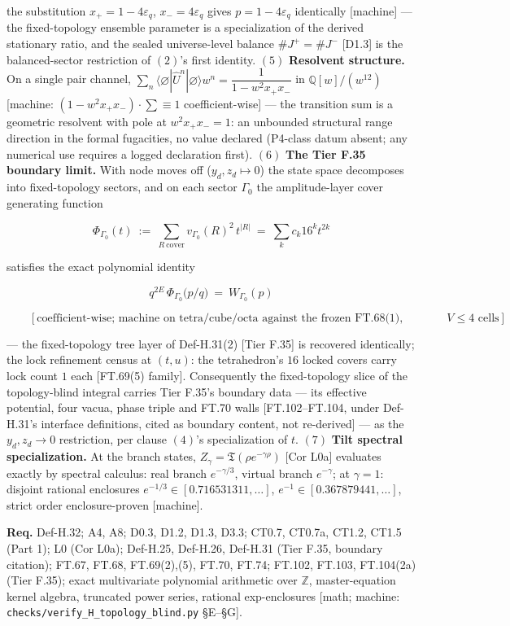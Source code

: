 \begin{theorem}
the substitution $x_+=1-4\varepsilon_q$, $x_-=4\varepsilon_q$ gives $p=1-4\varepsilon_q$ identically [machine] — the fixed-topology ensemble parameter is a specialization of the derived stationary ratio, and the sealed universe-level balance $\#J^+=\#J^-$ [D1.3] is the balanced-sector restriction of $(2)$'s first identity. $(5)$ \textbf{Resolvent structure.} On a single pair channel, $\sum_n\langle\varnothing|\hat U^n|\varnothing\rangle w^n=\dfrac{1}{1-w^2x_+x_-}$ in $\mathbb Q[w]/(w^{12})$ [machine: $(1-w^2x_+x_-)\cdot\sum\equiv1$ coefficient-wise] — the transition sum is a geometric resolvent with pole at $w^2x_+x_-=1$: an unbounded structural range direction in the formal fugacities, no value declared (P4-class datum absent; any numerical use requires a logged declaration first). $(6)$ \textbf{The Tier F.35 boundary limit.} With node moves off ($y_d,z_d\mapsto0$) the state space decomposes into fixed-topology sectors, and on each sector $\Gamma_0$ the amplitude-layer cover generating function

\[
\Phi_{\Gamma_0}(t)\ :=\ \sum_{R\ \mathrm{cover}}v_{\Gamma_0}(R)^2\,t^{|R|}\ =\ \sum_kc_k16^kt^{2k}
\]

satisfies the exact polynomial identity

\[
q^{2E}\,\Phi_{\Gamma_0}\bigl(p/q\bigr)\ =\ W_{\Gamma_0}(p)
\]

\[
\qquad [\text{coefficient-wise; machine on tetra/cube/octa against the frozen FT.68(1),(3)/FT.69(2) rows and on all nine live }V\le4\text{ cells}]
\]

— the fixed-topology tree layer of Def-H.31(2) [Tier F.35] is recovered identically; the lock refinement census at $(t,u)$: the tetrahedron's $16$ locked covers carry lock count $1$ each [FT.69(5) family]. Consequently the fixed-topology slice of the topology-blind integral carries Tier F.35's boundary data — its effective potential, four vacua, phase triple and FT.70 walls [FT.102–FT.104, under Def-H.31's interface definitions, cited as boundary content, not re-derived] — as the $y_d,z_d\to0$ restriction, per clause $(4)$'s specialization of $t$. $(7)$ \textbf{Tilt spectral specialization.} At the branch states, $Z_\gamma=\mathfrak T(\rho e^{-\gamma\rho})$ [Cor L0a] evaluates exactly by spectral calculus: real branch $e^{-\gamma/3}$, virtual branch $e^{-\gamma}$; at $\gamma=1$: disjoint rational enclosures $e^{-1/3}\in[0.716531311,\ldots]$, $e^{-1}\in[0.367879441,\ldots]$, strict order enclosure-proven [machine].

\textbf{Req.} Def-H.32; A4, A8; D0.3, D1.2, D1.3, D3.3; CT0.7, CT0.7a, CT1.2, CT1.5 (Part 1); L0 (Cor L0a); Def-H.25, Def-H.26, Def-H.31 (Tier F.35, boundary citation); FT.67, FT.68, FT.69(2),(5), FT.70, FT.74; FT.102, FT.103, FT.104(2a) (Tier F.35); exact multivariate polynomial arithmetic over $\mathbb Z$, master-equation kernel algebra, truncated power series, rational exp-enclosures [math; machine: \texttt{checks/\allowbreak{}verify\_\allowbreak{}H\_\allowbreak{}topology\_\allowbreak{}blind.py} §E–§G].


\end{theorem}
